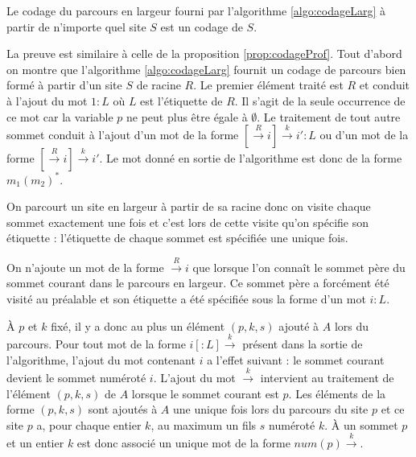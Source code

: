 \begin{prop}
 Le codage du parcours en largeur fourni par l'algorithme \ref{algo:codageLarg} à partir de n'importe quel site $S$ est un codage de $S$.
\label{prop:codageLarg}
\end{prop}

\begin{pr}
La preuve est similaire à celle de la proposition \ref{prop:codageProf}. 
Tout d'abord on montre que l'algorithme \ref{algo:codageLarg} fournit un codage de parcours bien formé à partir d'un site $S$ de racine $R$.
Le premier élément traité est $R$ et conduit à l'ajout du mot $1:L$ où $L$ est l'étiquette de $R$. 
Il s'agit de la seule occurrence de ce mot car la variable $p$ ne peut plus être égale à $\emptyset$. Le traitement de tout autre sommet conduit à l'ajout d'un mot de la forme $[\xrightarrow{R}i]\xrightarrow{k}i':L$ ou d'un mot de la forme $[\xrightarrow{R}i]\xrightarrow{k}i'$. 
Le mot donné en sortie de l'algorithme est donc de la forme $m_1(m_2)^*$.

On parcourt un site en largeur à partir de sa racine donc on visite chaque sommet exactement une fois et c'est lors de cette visite qu'on spécifie son étiquette : l'étiquette de chaque sommet est spécifiée une unique fois.

On n'ajoute un mot de la forme $\xrightarrow{R}i$ que lorsque l'on connaît le sommet père du sommet courant dans le parcours en largeur. 
Ce sommet père a forcément été visité au préalable et son étiquette a été spécifiée sous la forme d'un mot $i:L$.

À $p$ et $k$ fixé, il y a donc au plus un élément $(p, k, s)$ ajouté à $A$ lors du parcours. 
Pour tout mot de la forme $i[:L]\xrightarrow{k}$ présent dans la sortie de l'algorithme, l'ajout du mot contenant $i$ a l'effet suivant : le sommet courant devient le sommet numéroté $i$. 
L'ajout du mot $\xrightarrow{k}$ intervient au traitement de l'élément $(p, k, s)$ de $A$ lorsque le sommet courant est $p$. 
Les éléments de la forme $(p, k, s)$ sont ajoutés à $A$ une unique fois lors du parcours du site $p$ et ce site $p$ a, pour chaque entier $k$, au maximum un fils $s$ numéroté $k$.
À un sommet $p$ et un entier $k$ est donc associé un unique mot de la forme $num(p)\xrightarrow{k}$.


\end{pr}
